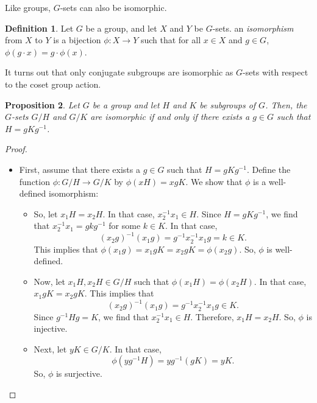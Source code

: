 \documentclass[a4paper, openany]{memoir}
\theoremstyle{definition}
\newtheorem{definition}{Definition}[section]
\theoremstyle{plain}
\newtheorem{proposition}[definition]{Proposition}
\begin{document}
Like groups, $G$-sets can also be isomorphic.
\begin{definition}
Let $G$ be a group, and let $X$ and $Y$ be $G$-sets. an \emph{isomorphism} from $X$ to $Y$ is a bijection $\phi: X \to Y$ such that for all $x \in X$ and $g \in G$, $\phi(g \cdot x) = g \cdot \phi(x)$.
\end{definition}
\noindent It turns out that only conjugate subgroups are isomorphic as $G$-sets with respect to the coset group action.
\begin{proposition}
Let $G$ be a group and let $H$ and $K$ be subgroups of $G$. Then, the $G$-sets $G/H$ and $G/K$ are isomorphic if and only if there exists a $g \in G$ such that $H = gKg^{-1}$.
\end{proposition}
\begin{proof}
\hspace*{0pt}
\begin{itemize}
    \item First, assume that there exists a $g \in G$ such that $H = gKg^{-1}$. Define the function $\phi: G/H \to G/K$ by $\phi(xH) = xgK$. We show that $\phi$ is a well-defined isomorphism:
    \begin{itemize}
        \item So, let $x_1H = x_2H$. In that case, $x_2^{-1}x_1 \in H$. Since $H = gKg^{-1}$, we find that $x_2^{-1}x_1 = gkg^{-1}$ for some $k \in K$. In that case, 
        \[(x_2g)^{-1} (x_1g) = g^{-1}x_2^{-1} x_1g = k \in K.\]
        This implies that $\phi(x_1g) = x_1gK = x_2gK = \phi(x_2g)$. So, $\phi$ is well-defined.
        
        \item Now, let $x_1H, x_2H \in G/H$ such that $\phi(x_1H) = \phi(x_2H)$. In that case, $x_1gK = x_2gK$. This implies that 
        \[(x_2g)^{-1}(x_1g) = g^{-1}x_2^{-1}x_1g \in K.\]
        Since $g^{-1}Hg = K$, we find that $x_2^{-1}x_1 \in H$. Therefore, $x_1H = x_2H$. So, $\phi$ is injective.
        
        \item Next, let $yK \in G/K$. In that case,
        \[\phi(yg^{-1} H) = yg^{-1} (gK) = yK.\]
        So, $\phi$ is surjective.
        

\end{itemize}
\end{itemize}
\end{proof}
\end{document}
